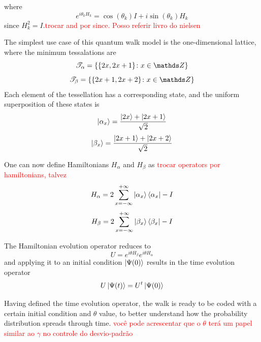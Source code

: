             	where
            	\begin{equation}
            	    e^{i\theta_{k}H_{k}} = \cos{(\theta_k)}I + i\sin{(\theta_k)}H_k
            	\end{equation}
            	since $H_k^2 = I$.\textcolor{red}{trocar and por since. Posso referir livro do nielsen}\par
            	The simplest use case of this quantum walk model is the one-dimensional lattice, where the minimum tessalations are
            	\begin{equation}
            	    \mathscr{T}_{\alpha}= \{\{2x,2x+1\}\colon x \in \Z\}
            	\end{equation}
            	\begin{equation}
            	    \mathscr{T}_{\beta}= \{\{2x+1,2x+2\}\colon x \in \Z\}
            	\end{equation}
            	 Each element of the tessellation has a corresponding state, and the uniform superposition of these states is
            	\begin{equation}
            	    \ket{\alpha_x} = \frac{\ket{2x} + \ket{2x+1}}{\sqrt{2}}
            	\end{equation}
            	\begin{equation}
            	    \ket{\beta_x} = \frac{\ket{2x+1}+\ket{2x+2}}{\sqrt{2}}
            	\end{equation}\par
            	One can now define Hamiltonians $H_\alpha$ and $H_\beta$ as \textcolor{red}{trocar operators por hamiltonians, talvez} 
            	\begin{equation}
            	    H_\alpha = 2\sum_{x=-\infty}^{+\infty}\ket{\alpha_{x}}\bra{\alpha_x} - I
            	\end{equation}
            	\begin{equation}
            	    H_\beta = 2\sum_{x=-\infty}^{+\infty}\ket{\beta_{x}}\bra{\beta_x} - I
            	\end{equation}\par
            	The Hamiltonian evolution operator reduces to
            	\begin{equation}
            	    U = e^{i\theta H_\beta}e^{i\theta H_\alpha}
            	\end{equation}
                and applying it to an initial condition $\ket{\Psi(0)}$ results in the time evolution operator
                \begin{equation}
                    U\ket{\Psi(t)} = U^t\ket{\Psi(0)}
                \end{equation}\par
                Having defined the time evolution operator, the walk is ready to be coded with a certain initial condition and $\theta$ value, to better understand how the probability distribution spreads through time. \textcolor{red}{você pode acrescentar que o $\theta$ terá um papel similar ao $\gamma$ no controle do desvio-padrão}
                
